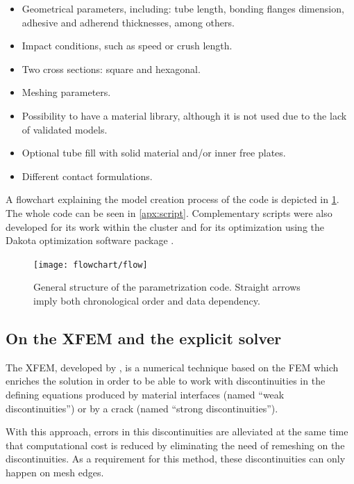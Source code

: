 \documentclass[cmfonts]{witpress}
\begin{document}
\begin{itemize}
	\item Geometrical parameters, including: tube length, bonding flanges dimension, adhesive and adherend thicknesses, among others.

	\item Impact conditions, such as speed or crush length.

	\item Two cross sections: square and hexagonal.

	\item Meshing parameters.

	\item Possibility to have a material library, although it is not used due to the lack of validated models.

	\item Optional tube fill with solid material and/or inner free plates.

	\item Different contact formulations.
\end{itemize}

A flowchart explaining the model creation process of the code is depicted in \cref{fig:flow}. The whole code can be seen in \cref{apx:script}. Complementary scripts were also developed for its work within the cluster and for its optimization using the Dakota optimization software package \cite{dakota}.

\begin{figure}
	\centering
	\texttt{[image: flowchart/flow]}
	\caption[General structure of the parameterized code.]{General structure of the parametrization code. Straight arrows imply both chronological order and data dependency.}
	\label{fig:flow}
\end{figure}


\subsection{On the XFEM and the explicit solver}
\label{sec:xfem}

The XFEM, developed by \cite{Moes1999}, is a numerical technique based on the FEM which enriches the solution in order to be able to work with discontinuities in the defining equations produced by material interfaces (named ``weak discontinuities'') or by a crack (named ``strong discontinuities'').

With this approach, errors in this discontinuities are alleviated at the same time that computational cost is reduced by eliminating the need of remeshing on the discontinuities. As a requirement for this method, these discontinuities can only happen on mesh edges.
\end{document}
